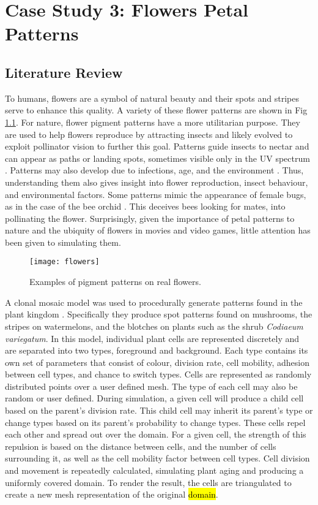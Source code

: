 \chapter{Case Study 3: Flowers Petal Patterns}

\section{Literature Review}
To humans, flowers are a symbol of natural beauty and their spots and stripes serve to enhance this quality. A variety of these flower patterns are shown in Fig \ref{fig:realFlowers}. For nature, flower pigment patterns have a more  utilitarian purpose. They are used to help flowers reproduce by attracting insects and likely evolved to exploit pollinator vision to further this goal. Patterns guide insects to nectar and can appear as paths or landing spots, sometimes visible only in the UV spectrum \cite{Davies2012}. Patterns may also develop due to infections, age, and the environment \cite{Davies2012} \cite{ROBINSON2015}. Thus, understanding them also gives insight into flower reproduction, insect behaviour, and environmental factors. Some patterns mimic the appearance of female bugs, as in the case of the bee orchid \cite{Vereecken7484}. This deceives bees looking for mates, into pollinating the flower. Surprisingly, given the importance of petal patterns to nature and the ubiquity of flowers in movies and video games, little attention has been given to simulating them. 

\clearpage
\begin{figure}[!ht]
	\centering
	\texttt{[image: flowers]}
	\caption{Examples of pigment patterns on real flowers.}
	\label{fig:realFlowers}
\end{figure}
A clonal mosaic model was used to procedurally generate patterns found in the plant kingdom \cite{binsfeld2011}. Specifically they produce spot patterns found on mushrooms, the stripes on watermelons, and the blotches on plants such as the shrub \textit{Codiaeum variegatum}. In this model, individual plant cells are represented discretely and are separated into two types, foreground and background. Each type contains its own set of parameters that consist of colour, division rate, cell mobility, adhesion between cell types, and chance to switch types. Cells are represented as randomly distributed points over a user defined mesh. The type of each cell may also be random or user defined. During simulation, a given cell will produce a child cell based on the parent's division rate. This child cell may inherit its parent's type or change types based on its parent's probability to change types. These cells repel each other and spread out over the domain. For a given cell, the strength of this repulsion is based on the distance between cells, and the number of cells surrounding it, as well as the cell mobility factor between cell types. Cell division and movement is repeatedly calculated, simulating plant aging and producing a uniformly covered domain. To render the result, the cells are triangulated to create a new mesh representation of the original \hl{domain}. 

